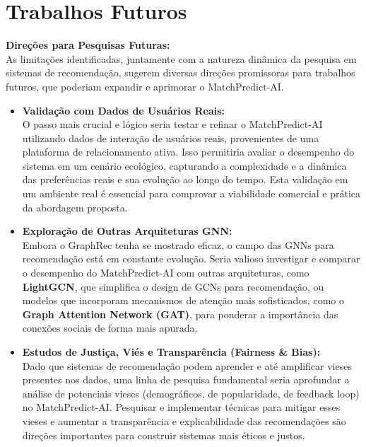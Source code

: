 \section{Trabalhos Futuros}
\label{sec:discussao_trabalhos_futuros}

\textbf{Direções para Pesquisas Futuras:} \\
As limitações identificadas, juntamente com a natureza dinâmica da pesquisa em sistemas de recomendação, sugerem diversas direções promissoras para trabalhos futuros, que poderiam expandir e aprimorar o MatchPredict-AI.

\begin{itemize}
    \item \textbf{Validação com Dados de Usuários Reais:}
    \\ O passo mais crucial e lógico seria testar e refinar o MatchPredict-AI utilizando dados de interação de usuários reais, provenientes de uma plataforma de relacionamento ativa. Isso permitiria avaliar o desempenho do sistema em um cenário ecológico, capturando a complexidade e a dinâmica das preferências reais e sua evolução ao longo do tempo. Esta validação em um ambiente real é essencial para comprovar a viabilidade comercial e prática da abordagem proposta.

    \item \textbf{Exploração de Outras Arquiteturas GNN:}
    \\ Embora o GraphRec tenha se mostrado eficaz, o campo das GNNs para recomendação está em constante evolução. Seria valioso investigar e comparar o desempenho do MatchPredict-AI com outras arquiteturas, como \textbf{LightGCN}, que simplifica o design de GCNs para recomendação, ou modelos que incorporam mecanismos de atenção mais sofisticados, como o \textbf{Graph Attention Network (GAT)}, para ponderar a importância das conexões sociais de forma mais apurada.

    \item \textbf{Estudos de Justiça, Viés e Transparência (Fairness \& Bias):}
    \\ Dado que sistemas de recomendação podem aprender e até amplificar vieses presentes nos dados, uma linha de pesquisa fundamental seria aprofundar a análise de potenciais vieses (demográficos, de popularidade, de feedback loop) no MatchPredict-AI. Pesquisar e implementar técnicas para mitigar esses vieses e aumentar a transparência e explicabilidade das recomendações são direções importantes para construir sistemas mais éticos e justos.


\end{itemize}
